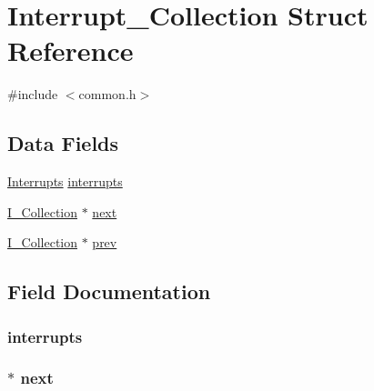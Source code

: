 \hypertarget{struct_interrupt___collection}{}\section{Interrupt\+\_\+\+Collection Struct Reference}
\label{struct_interrupt___collection}


{\ttfamily \#include $<$common.\+h$>$}

\subsection*{Data Fields}
\begin{DoxyCompactItemize}
\item 
\hyperlink{common_8h_a3252589b9348b042085b311aae270684}{Interrupts} \hyperlink{struct_interrupt___collection_ab342d93ebde06a9e9d859f79b5d2b6f9}{interrupts}
\item 
\hyperlink{common_8h_ac9ff34c92af65496204dc94ca2099494}{I\+\_\+\+Collection} $\ast$ \hyperlink{struct_interrupt___collection_a7d253fc5e51eae3defa6513b6249abb5}{next}
\item 
\hyperlink{common_8h_ac9ff34c92af65496204dc94ca2099494}{I\+\_\+\+Collection} $\ast$ \hyperlink{struct_interrupt___collection_adb843227cc331b7ed44724902deca22f}{prev}
\end{DoxyCompactItemize}


\subsection{Field Documentation}
\subsubsection[{\texorpdfstring{interrupts}{interrupts}}]{ interrupts}\hypertarget{struct_interrupt___collection_ab342d93ebde06a9e9d859f79b5d2b6f9}{}\label{struct_interrupt___collection_ab342d93ebde06a9e9d859f79b5d2b6f9}
\subsubsection[{\texorpdfstring{next}{next}}]{$\ast$ next}\hypertarget{struct_interrupt___collection_a7d253fc5e51eae3defa6513b6249abb5}{}\label{struct_interrupt___collection_a7d253fc5e51eae3defa6513b6249abb5}
